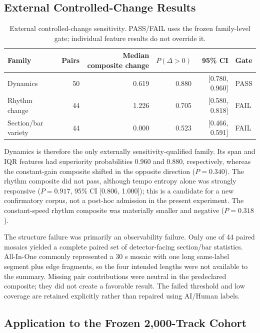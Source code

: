 \subsection{External Controlled-Change Results}

\begin{table}[H]
\centering
\caption{External controlled-change sensitivity.  PASS/FAIL uses the frozen
family-level gate; individual feature results do not override it.}
\label{tab:controlled-change}
\begin{tabular}{lrrrrl}
\toprule
Family & Pairs & Median composite change & $P(\Delta>0)$ & 95\% CI & Gate \\
\midrule
Dynamics & 50 & 0.619 & 0.880 & [0.780, 0.960] & PASS \\
Rhythm change & 44 & 1.226 & 0.705 & [0.580, 0.818] & FAIL \\
Section/bar variety & 44 & 0.000 & 0.523 & [0.466, 0.591] & FAIL \\
\bottomrule
\end{tabular}
\end{table}

Dynamics is therefore the only externally sensitivity-qualified family.  Its
span and IQR features had superiority probabilities 0.960 and 0.880,
respectively, whereas the constant-gain composite shifted in the opposite
direction ($P=0.340$).  The rhythm composite did not pass, although tempo
entropy alone was strongly responsive ($P=0.917$, 95\% CI
[0.806, 1.000]); this is a candidate for a new confirmatory corpus, not a
post-hoc admission in the present experiment.  The constant-speed rhythm
composite was materially smaller and negative ($P=0.318$).

The structure failure was primarily an observability failure.  Only one of 44
paired mosaics yielded a complete paired set of detector-facing section/bar
statistics.  All-In-One commonly represented a 30 s mosaic with one long
same-label segment plus edge fragments, so the four intended lengths were not
available to the summary.  Missing pair contributions were neutral in the
predeclared composite; they did not create a favorable result.  The failed
threshold and low coverage are retained explicitly rather than repaired using
AI/Human labels.

\subsection{Application to the Frozen 2,000-Track Cohort}

